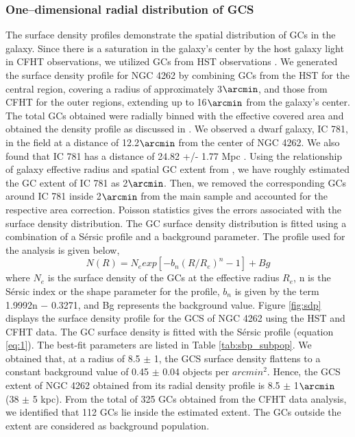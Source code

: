 \documentclass[fleqn,usenatbib]{mnras}
\begin{document}
\subsubsection{One--dimensional radial distribution of GCS}
\label{sec:radialprofile}
The surface density profiles demonstrate the spatial distribution of GCs in the galaxy. Since there is a saturation in the galaxy's center by the host galaxy light in CFHT observations, we utilized GCs from HST observations \citep{2009Jordan}. We generated the surface density profile for NGC 4262 by combining GCs from the HST for the central region, covering a radius of approximately 3$\arcmin$, and those from CFHT for the outer regions, extending up to 16$\arcmin$ from the galaxy's center. The total GCs obtained were radially binned with the effective covered area and obtained the density profile as discussed in \citet{sreeja2014,2016Kartha}.
We observed a dwarf galaxy, IC 781, in the field at a distance of 12.2$\arcmin$ from the center of NGC 4262. We also found that IC 781 has a distance of 24.82 +/- 1.77 Mpc \citep{2014Toloba}. Using the relationship of galaxy effective radius and spatial GC extent from \citet{sreeja2014}, we have roughly estimated the GC extent of IC 781 as 2$\arcmin$. Then, we removed the corresponding GCs around IC 781 inside 2$\arcmin$  from the main sample and accounted for the respective area correction. Poisson statistics gives the errors associated with the surface density distribution. The GC surface density distribution is fitted using a combination of a Sérsic profile and a background parameter. The profile used for the analysis is given below,
\begin{equation}
    N(R) = N_e exp[-b_n(R/R_e)^{n}-1] + Bg 
\label{eq:1}
\end{equation}
where $N_{e}$ is the surface density of the GCs at the effective radius $R_{e}$, n is the Sérsic index or the shape parameter for the profile, $b_{n}$ is given by the term 1.9992n − 0.3271, and Bg represents the background value. Figure \ref{fig:sdp} displays the surface density profile for the GCS of NGC 4262 using the HST and CFHT data. The GC surface density is fitted with the Sérsic profile (equation \ref{eq:1}). The best-fit parameters are listed in Table \ref{tab:sbp_subpop}. We obtained that, at a radius of 8.5 $\pm$  1\arcmin, the GCS surface density flattens to a constant background value of 0.45 $\pm$ 0.04 objects per $arcmin^{2}$. Hence, the GCS extent of NGC 4262 obtained from its radial density profile is 8.5 $\pm$ 1$\arcmin$ (38 $\pm$ 5 kpc).  From the total of 325 GCs obtained from the CFHT data analysis, we identified that 112 GCs lie inside the estimated extent. The GCs outside the extent are considered as background population.
\end{document}
